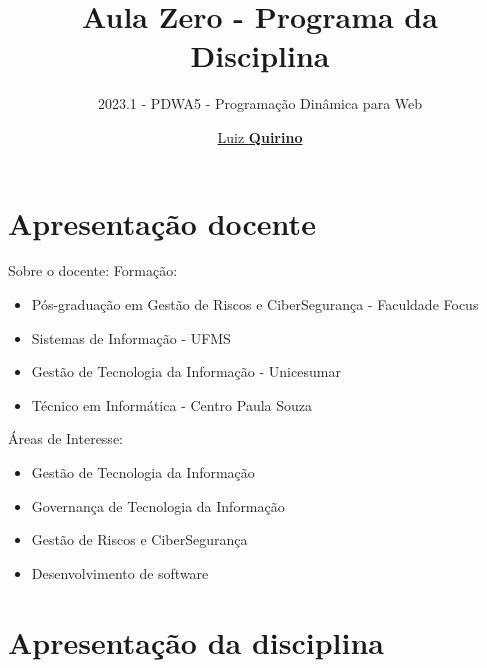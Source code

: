 \documentclass{beamer}
\title{Aula Zero - Programa da Disciplina}
\subtitle{2023.1 - PDWA5 - Programação Dinâmica para Web}
\author{\href{mailto:luiz.quirino@ifsp.edu.br}{Luiz \textbf{Quirino}}}
\newcommand{\hrefcol}[2]{\textcolor{cyan}{\href{#1}{#2}}}
\begin{document}
\maketitle

%
%


\section{Apresentação docente}

\begin{frame}{Sobre o docente:}
Formação:
\begin{itemize}
\item Pós-graduação em Gestão de Riscos e CiberSegurança - Faculdade Focus
\item Sistemas de Informação - UFMS
\item Gestão de Tecnologia da Informação - Unicesumar
\item Técnico em Informática - Centro Paula Souza
\end{itemize}
Áreas de Interesse:
\begin{itemize}
\item Gestão de Tecnologia da Informação
\item Governança de Tecnologia da Informação
\item Gestão de Riscos e CiberSegurança
\item Desenvolvimento de software
\end{itemize}
\end{frame}

\section{Apresentação da disciplina}
\end{document}
